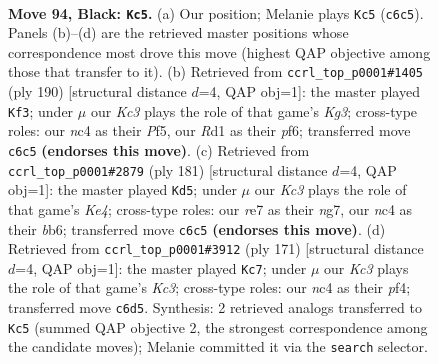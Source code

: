 \documentclass[11pt]{article}
\begin{document}
\clearpage

\begin{figure}[p]\centering
\begin{subfigure}{0.46\textwidth}\centering
\resizebox{\linewidth}{!}{%
\newchessgame
\chessboard[
  setfen={8/4R3/2k5/5K2/2N5/8/6P1/3r4 b - - 53 94},
  showmover=false,
  pgfstyle=straightmove, color=movearrow, markmove={c6-c5}
]}
\caption{}
\end{subfigure}\hfill
\begin{subfigure}{0.46\textwidth}\centering
\resizebox{\linewidth}{!}{%
\newchessgame
\chessboard[
  setfen={8/R7/5p1k/5P2/1r6/6K1/8/8 w - - 4 96},
  showmover=false,
  pgfstyle=straightmove, color=movearrow, markmove={g3-f3}
]}
\caption{}
\end{subfigure}
\\[4pt]
\begin{subfigure}{0.46\textwidth}\centering
\resizebox{\linewidth}{!}{%
\newchessgame
\chessboard[
  setfen={8/6N1/1B6/4k1P1/2r5/6K1/8/8 b - - 12 91},
  showmover=false,
  pgfstyle=straightmove, color=movearrow, markmove={e5-d5}
]}
\caption{}
\end{subfigure}\hfill
\begin{subfigure}{0.46\textwidth}\centering
\resizebox{\linewidth}{!}{%
\newchessgame
\chessboard[
  setfen={3R4/6r1/2k1p3/8/5P2/8/2K5/8 b - - 0 86},
  showmover=false,
  pgfstyle=straightmove, color=movearrow, markmove={c6-c7}
]}
\caption{}
\end{subfigure}
\caption{\textbf{Move 94, Black: \texttt{Kc5}.} (a) Our position; Melanie plays \texttt{Kc5} (\texttt{c6c5}). Panels (b)--(d) are the retrieved master positions whose correspondence most drove this move (highest QAP objective among those that transfer to it). (b) Retrieved from \texttt{ccrl\_top\_p0001\#1405} (ply 190) [structural distance $d$=4, QAP obj=1]: the master played \texttt{Kf3}; under $\mu$ our \emph{Kc3} plays the role of that game's \emph{Kg3}; cross-type roles: our \emph{n}c4 as their \emph{P}f5, our \emph{R}d1 as their \emph{p}f6; transferred move \texttt{c6c5} \textbf{(endorses this move)}. (c) Retrieved from \texttt{ccrl\_top\_p0001\#2879} (ply 181) [structural distance $d$=4, QAP obj=1]: the master played \texttt{Kd5}; under $\mu$ our \emph{Kc3} plays the role of that game's \emph{Ke4}; cross-type roles: our \emph{r}e7 as their \emph{n}g7, our \emph{n}c4 as their \emph{b}b6; transferred move \texttt{c6c5} \textbf{(endorses this move)}. (d) Retrieved from \texttt{ccrl\_top\_p0001\#3912} (ply 171) [structural distance $d$=4, QAP obj=1]: the master played \texttt{Kc7}; under $\mu$ our \emph{Kc3} plays the role of that game's \emph{Kc3}; cross-type roles: our \emph{n}c4 as their \emph{p}f4; transferred move \texttt{c6d5}. Synthesis: 2 retrieved analogs transferred to \texttt{Kc5} (summed QAP objective 2, the strongest correspondence among the candidate moves); Melanie committed it via the \texttt{search} selector.}
\label{fig:thought-m187}
\end{figure}
\end{document}
